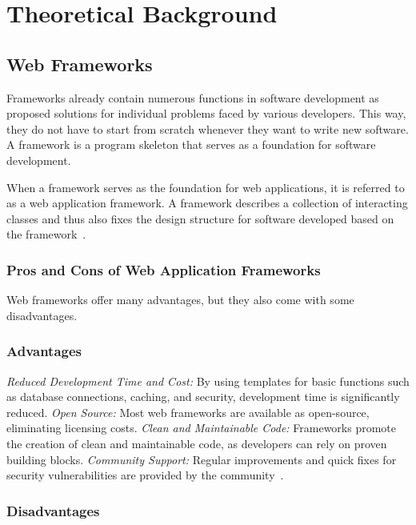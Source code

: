 \documentclass[conference]{IEEEtran}
\begin{document}
\section{Theoretical Background}

\subsection{Web Frameworks}

Frameworks already contain numerous functions in software development as proposed solutions for individual problems faced by various developers. This way, they do not have to start from scratch whenever they want to write new software. A framework is a program skeleton that serves as a foundation for software development.

When a framework serves as the foundation for web applications, it is referred to as a web application framework. A framework describes a collection of interacting classes and thus also fixes the design structure for software developed based on the framework~\cite{ionos_webframeworks}.
\newline\subsubsection{Pros and Cons of Web Application Frameworks}
Web frameworks offer many advantages, but they also come with some disadvantages.
\subsubsection{Advantages}
\textit{Reduced Development Time and Cost:} By using templates for basic functions such as database connections, caching, and security, development time is significantly reduced.
\newline\textit{Open Source:} Most web frameworks are available as open-source, eliminating licensing costs.
\newline\textit{Clean and Maintainable Code:} Frameworks promote the creation of clean and maintainable code, as developers can rely on proven building blocks.
\newline\textit{Community Support:} Regular improvements and quick fixes for security vulnerabilities are provided by the community~\cite{ionos_webframeworks}.

\subsubsection{Disadvantages}
\end{document}
